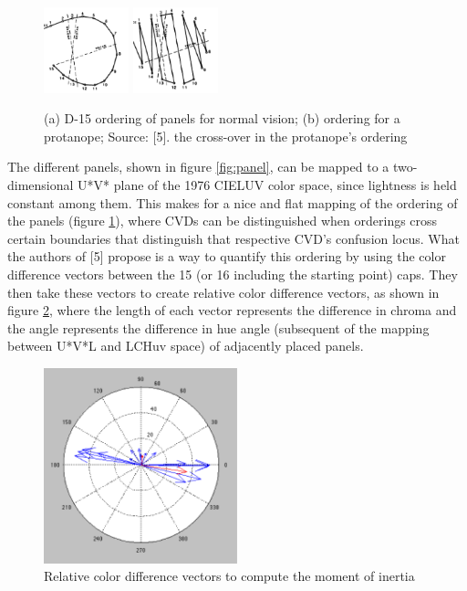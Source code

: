 \documentclass[10pt,twocolumn,letterpaper]{article}
\begin{document}
\begin{figure}[h]
  \includegraphics[width=0.22\textwidth]{luv1.png}
  \includegraphics[width=0.22\textwidth]{luv2.png}
  \caption{(a) D-15 ordering of panels for normal vision; (b) ordering for a protanope; Source: [5]. the cross-over in the protanope's ordering}
  \label{fig:luv}
\end{figure}

The different panels, shown in figure \ref{fig:panel}, can be mapped to a two-dimensional U*V* plane of the 1976 CIELUV color space, since lightness is held constant among them. This makes for a nice and flat mapping of the ordering of the panels (figure \ref{fig:luv}), where CVDs can be distinguished when orderings cross certain boundaries that distinguish that respective CVD’s confusion locus. What the authors of [5] propose is a way to quantify this ordering by using the color difference vectors between the 15 (or 16 including the starting point) caps.  They then take these vectors to create relative color difference vectors, as shown in figure \ref{fig:compass}, where the length of each vector represents the difference in chroma and the angle represents the difference in hue angle (subsequent of the mapping between U*V*L and LCHuv space) of adjacently placed panels.  

\begin{figure}[h]
  \includegraphics[width=0.5\textwidth]{compass.png}
  \caption{Relative color difference vectors to compute the moment of inertia}
  \label{fig:compass}
\end{figure}
\end{document}
